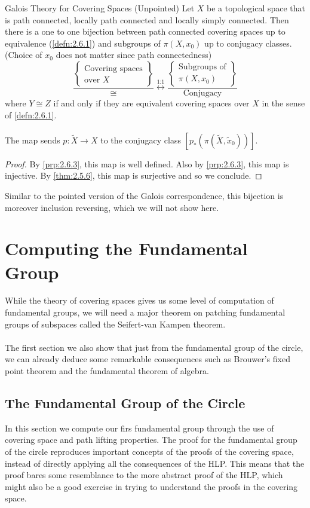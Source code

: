 \documentclass[a4paper]{article}
\begin{document}
\begin{thm}{Galois Theory for Covering Spaces (Unpointed)}{} Let $X$ be a topological space that is path connected, locally path connected and locally simply connected. Then there is a one to one bijection between path connected covering spaces up to equivalence (\ref{defn:2.6.1}) and subgroups of $\pi(X,x_0)$ up to conjugacy classes. (Choice of $x_0$ does not matter since path connectedness) $$\frac{\left\{\substack{\text{Covering spaces}\\\text{over }X}\right\}}{\cong}\overset{\text{1:1}}{\longleftrightarrow}\frac{\left\{\substack{\text{Subgroups of}\\\pi(X,x_0)}\right\}}{\text{Conjugacy}}$$ where $Y\cong Z$ if and only if they are equivalent covering spaces over $X$ in the sense of \ref{defn:2.6.1}. \\~\\

The map sends $p:\tilde{X}\to X$ to the conjugacy class $[p_\ast(\pi(\tilde{X},\tilde{x}_0))]$. \tcbline
\begin{proof}
By \ref{prp:2.6.3}, this map is well defined. Also by \ref{prp:2.6.3}, this map is injective. By \ref{thm:2.5.6}, this map is surjective and so we conclude. 
\end{proof}
\end{thm}

Similar to the pointed version of the Galois correspondence, this bijection is moreover inclusion reversing, which we will not show here. 

\pagebreak
\section{Computing the Fundamental Group}
While the theory of covering spaces gives us some level of computation of fundamental groups, we will need a major theorem on patching fundamental groups of subspaces called the Seifert-van Kampen theorem. \\~\\

The first section we also show that just from the fundamental group of the circle, we can already deduce some remarkable consequences such as Brouwer's fixed point theorem and the fundamental theorem of algebra. 

\subsection{The Fundamental Group of the Circle}
In this section we compute our firs fundamental group through the use of covering space and path lifting properties. The proof for the fundamental group of the circle reproduces important concepts of the proofs of the covering space, instead of directly applying all the consequences of the HLP. This means that the proof bares some resemblance to the more abstract proof of the HLP, which might also be a good exercise in trying to understand the proofs in the covering space. 
\end{document}
